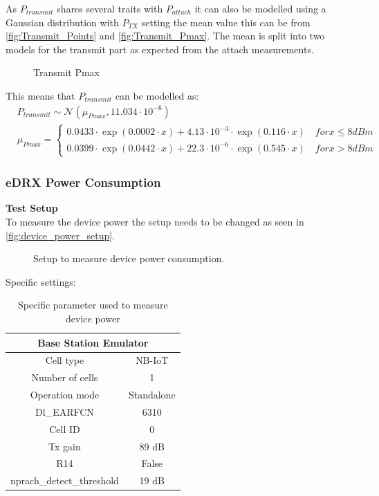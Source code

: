 As $P_{transmit}$ shares several traits with $P_{attach}$ it can also be modelled using a Gaussian distribution with $P_{TX}$ setting the mean value this can be from \autoref{fig:Transmit_Points} and \autoref{fig:Transmit_Pmax}. The mean is split into two models for the transmit part as expected from the attach measurements. 

\begin{figure}[H]
\centering
\resizebox{\textwidth}{!}{
}
\caption{Transmit Pmax}
\label{fig:Transmit_Pmax}
\end{figure}

This means that $P_{transmit}$ can be modelled as:
\begin{align}
&P_{transmit} \sim \mathcal{N}(\mu_{Pmax},11.034\cdot 10^{-6}) \\ \nonumber
&\mu_{Pmax} = \begin{cases} 0.0433\cdot\exp{(0.0002\cdot x)} + 4.13\cdot10^{-3}\cdot\exp{(0.116\cdot x)} \quad for x \leq 8 dBm \\
0.0399\cdot\exp{(0.0442\cdot x)} + 22.3\cdot10^{-6}\cdot\exp{(0.545\cdot x)} \quad for x > 8 dBm \end{cases}
\end{align}


\subsubsection{\gls{eDRX} Power Consumption}
\textbf{Test Setup}\\
To measure the device power the setup needs to be changed as seen in \autoref{fig:device_power_setup}.

\begin{figure}[H]
\centering
{}
\caption{Setup to measure device power consumption.}
\label{fig:device_power_setup}
\end{figure}



Specific settings:
\begin{table}[H]
\centering
\begin{tabular}{|c|c|} \hline
\multicolumn{2}{|c|}{\textbf{Base Station Emulator}} \\ \hline
Cell type          & NB-IoT         \\ \hline
Number of cells    & 1              \\ \hline
Operation mode     & Standalone     \\ \hline
Dl\_EARFCN         & 6310           \\ \hline
Cell ID            & 0              \\ \hline
Tx gain            & 89 dB          \\ \hline
R14                & False          \\ \hline
nprach\_detect\_threshold  & 19 dB  \\ \hline
\end{tabular}
\caption{Specific parameter used to measure device power}
\label{tab:device_power_settings}
\end{table}



